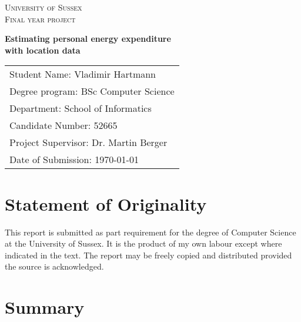 \documentclass[12pt, a4paper]{report}   %
\begin{document}
\begin{center}


\textsc{\large University of Sussex}\\[1.5cm]
\textsc{Final year project}\\[2cm]


\begin{spacing}{2.5}
{\Large \bfseries Estimating personal energy expenditure \\ with location data}\\[5 cm]
\end{spacing}
\end{center}
\vfill


\begin{spacing}{1.5}
\begin{tabular}{l}
Student Name: Vladimir Hartmann \\
Degree program: BSc Computer Science \\
Department: School of Informatics \\
Candidate Number: 52665 \\
Project Supervisor: Dr. Martin Berger \\
Date of Submission: {\today}
\end{tabular}
\end{spacing}
\thispagestyle{empty}


\clearpage
{}
\section*{Statement of Originality}
This report is submitted as part requirement for the degree of Computer Science at the University of Sussex. It is the product of my own labour except where indicated in the text. The report may be freely copied and distributed provided the source is acknowledged.


\clearpage
\section*{Summary}


\tableofcontents
\thispagestyle{empty}


\clearpage
{}
\end{document}

